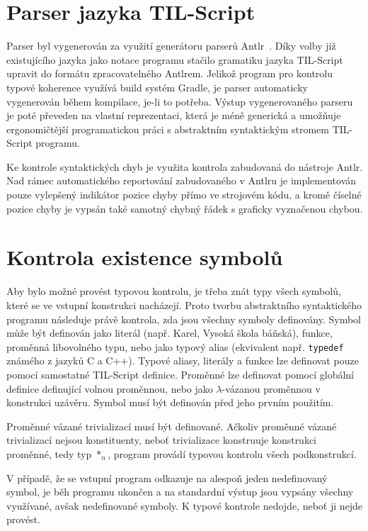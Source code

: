 \documentclass{article}
\begin{document}
\section{Parser jazyka TIL-Script}

Parser byl vygenerován za využití generátoru parserů Antlr~\cite{antlr-src}. Díky volby již existujícího
jazyka jako notace programu stačilo gramatiku jazyka TIL-Script upravit do formátu zpracovatelného
Antlrem. Jelikož program pro kontrolu typové koherence využívá build systém Gradle, je parser automaticky
vygenerován během kompilace, je-li to potřeba. Výstup vygenerovaného parseru je poté převeden na vlastní
reprezentaci, která je méně generická a umožňuje ergonomičtější programatickou práci s abstraktním
syntaktickým stromem TIL-Script programu.

Ke kontrole syntaktických chyb je využita kontrola zabudovaná do nástroje Antlr. Nad rámec automatického
reportování zabudovaného v Antlru je implementován pouze vylepšený indikátor pozice chyby přímo
ve strojovém kódu, a kromě číselné pozice chyby je vypsán také samotný chybný řádek s graficky vyznačenou
chybou.

\section{Kontrola existence symbolů}

Aby bylo možné provést typovou kontrolu, je třeba znát typy všech symbolů, které se ve vstupní konstrukci
nacházejí. Proto tvorbu abstraktního syntaktického programu následuje právě kontrola, zda jsou všechny
symboly definovány. Symbol může být definován jako literál (např. Karel, Vysoká škola báňská), funkce,
proměnná libovolného typu, nebo jako typový alias (ekvivalent např. \texttt{typedef} známého z jazyků
C a C++). Typové aliasy, literály a funkce lze definovat pouze pomocí samostatné TIL-Script definice.
Proměnné lze definovat pomocí globální definice definující volnou proměnnou, nebo jako $\lambda$-vázanou
proměnnou v konstrukci uzávěru. Symbol musí být definován před jeho prvním použitím.

Proměnné vázané trivializací musí být definované. Ačkoliv proměnné vázané trivializací nejsou konstituenty,
neboť trivializace konstruuje konstrukci proměnné, tedy typ $*_{n}$, program provádí typovou kontrolu všech
podkonstrukcí.

V případě, že se vstupní program odkazuje na alespoň jeden nedefinovaný symbol, je běh programu ukončen a
na standardní výstup jsou vypsány všechny využívané, avšak nedefinované symboly. K typové kontrole nedojde,
neboť ji nejde provést.
\end{document}
